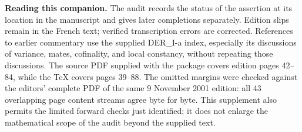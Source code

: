 \medskip
\noindent\textbf{Reading this companion.}
The audit records the status of the assertion at its location in the
manuscript and gives later completions separately. Edition slips remain in
the French text; verified transcription errors are corrected. References
to earlier commentary use the supplied DER\_I-a index, especially its
discussions of variance, mates, cofinality, and local constancy, without
repeating those discussions. The source PDF supplied with the package
covers edition pages 42--84, while the TeX covers pages 39--88. The omitted
margins were checked against the editors' complete PDF of the same
9 November 2001 edition: all 43 overlapping page content streams agree
byte for byte. This supplement also permits the limited forward checks
just identified; it does not enlarge the mathematical scope of the audit
beyond the supplied text.
